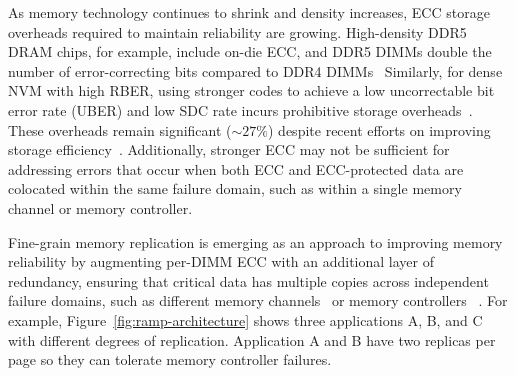 As memory technology continues to shrink and density increases, ECC storage overheads required to maintain reliability are growing. 
High-density DDR5 DRAM chips, for example, include on-die ECC, and DDR5 DIMMs double the number of error-correcting bits compared to DDR4 DIMMs~\cite{micron:ddr5:whitepaper}
Similarly, for dense NVM with high RBER, using stronger codes to achieve a low uncorrectable bit error rate (UBER) and low SDC rate incurs prohibitive storage overheads~\cite{zhang:pm-chipkill:micro:2018}.
These overheads remain significant ($\sim27\%$) despite recent efforts on improving storage
efficiency~\cite{zhang:pm-chipkill:micro:2018}. 
Additionally, stronger ECC may not be sufficient for addressing errors that occur when both ECC and ECC-protected data are colocated within the same failure domain, such as within a single memory channel or memory controller.

Fine-grain memory replication is emerging as an approach
to improving memory reliability by augmenting per-DIMM ECC with an additional layer of redundancy, ensuring that critical data has multiple copies across independent failure domains, such as different memory channels~\cite{zheng:raim:isca:2017} or memory controllers~ \cite{patil:dve:isca:2021}.
For example, Figure~\ref{fig:ramp-architecture} shows three applications A, B, and C with different degrees of replication.
Application A and B have two replicas per page so they can tolerate memory controller failures.


